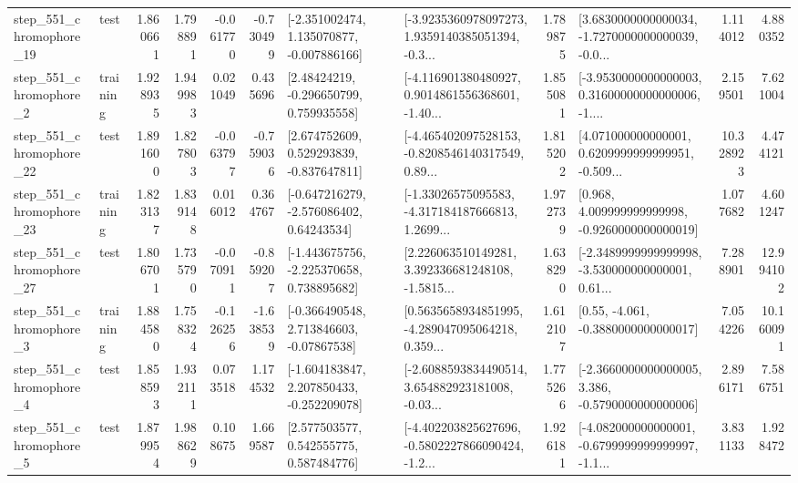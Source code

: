 \begin{tabular}{llrrrrllrlrr}
  step\_551\_chromophore\_19 &      test &      1.860661 &    1.798891 &     -0.061770 & -0.730499 &   [-2.351002474, 1.135070877, -0.007886166] &  [-3.9235360978097273, 1.9359140385051394, -0.3... &       1.789875 &  [3.6830000000000034, -1.7270000000000039, -0.0... &            1.114012 &          4.880352 \\
   step\_551\_chromophore\_2 &  training &      1.928935 &    1.949983 &      0.021049 &  0.435696 &     [2.48424219, -0.296650799, 0.759935558] &  [-4.116901380480927, 0.9014861556368601, -1.40... &       1.855081 &  [-3.9530000000000003, 0.31600000000000006, -1.... &            2.159501 &          7.621004 \\
  step\_551\_chromophore\_22 &      test &      1.891600 &    1.827803 &     -0.063797 & -0.759036 &    [2.674752609, 0.529293839, -0.837647811] &  [-4.465402097528153, -0.8208546140317549, 0.89... &       1.815202 &  [4.071000000000001, 0.6209999999999951, -0.509... &           10.328923 &          4.474121 \\
  step\_551\_chromophore\_23 &  training &      1.823137 &    1.839148 &      0.016012 &  0.364767 &    [-0.647216279, -2.576086402, 0.64243534] &  [-1.33026575095583, -4.317184187666813, 1.2699... &       1.972739 &    [0.968, 4.009999999999998, -0.9260000000000019] &            1.077682 &          4.601247 \\
  step\_551\_chromophore\_27 &      test &      1.806701 &    1.735790 &     -0.070911 & -0.859207 &   [-1.443675756, -2.225370658, 0.738895682] &  [2.226063510149281, 3.392336681248108, -1.5815... &       1.638290 &  [-2.3489999999999998, -3.530000000000001, 0.61... &            7.288901 &         12.994102 \\
   step\_551\_chromophore\_3 &  training &      1.884580 &    1.758324 &     -0.126256 & -1.638539 &    [-0.366490548, 2.713846603, -0.07867538] &  [0.5635658934851995, -4.289047095064218, 0.359... &       1.612107 &                [0.55, -4.061, -0.3880000000000017] &            7.054226 &         10.160091 \\
   step\_551\_chromophore\_4 &      test &      1.858593 &    1.932111 &      0.073518 &  1.174532 &   [-1.604183847, 2.207850433, -0.252209078] &  [-2.6088593834490514, 3.654882923181008, -0.03... &       1.775266 &  [-2.3660000000000005, 3.386, -0.5790000000000006] &            2.896171 &          7.586751 \\
   step\_551\_chromophore\_5 &      test &      1.879954 &    1.988629 &      0.108675 &  1.669587 &     [2.577503577, 0.542555775, 0.587484776] &  [-4.402203825627696, -0.5802227866090424, -1.2... &       1.926181 &  [-4.082000000000001, -0.6799999999999997, -1.1... &            3.831133 &          1.928472 \\

\end{tabular}
